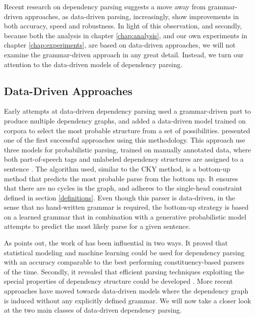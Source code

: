 Recent research on dependency parsing suggests a move away from grammar-driven approaches, as data-driven parsing, increasingly, show improvements in both accuracy, speed and robustness. In light of this observation, and secondly, because both the analysis in chapter \ref{chap:analysis}, and our own experiments in chapter \ref{chap:experiments}, are based on data-driven approaches, we will not examine the grammar-driven approach in any great detail. Instead, we turn our attention to the data-driven models of dependency parsing.

\subsection{Data-Driven Approaches}
\label{data-driven}

Early attempts at data-driven dependency parsing used a grammar-driven part to produce multiple dependency graphs, and added a data-driven model trained on corpora to select the most probable structure from a set of possibilities. \citeauthor{Eisner:96b} presented one of the first successful approaches using this methodology. This approach use three models for probabilistic parsing, trained on manually annotated data, where both part-of-speech tags and unlabeled dependency structures are assigned to a sentence \cite{Eisner:96b}. The algorithm used, similar to the CKY method, is a bottom-up method that predicts the most probable parse from the bottom up. It ensures that there are no cycles in the graph, and adheres to the single-head constraint defined in section \ref{definitions}. Even though this parser is  data-driven, in the sense that no hand-written grammar is required, the bottom-up strategy is based on a learned grammar that in combination with a generative probabilistic model attempts to predict the most likely parse for a given sentence.

As \citeauthor{Niv:05} points out, the work of \citeauthor{Eisner:96b} has been influential in two ways. It proved that statistical modeling and machine learning could be used for dependency parsing with an accuracy comparable to the best performing constituency-based parsers of the time. Secondly, it revealed that efficient parsing techniques exploiting the special properties of dependency structure could be developed \cite{Niv:05}. More recent approaches have moved towards data-driven models where the dependency graph is induced without any explicitly defined grammar. We will now take a closer look at the two main classes of data-driven dependency parsing.

